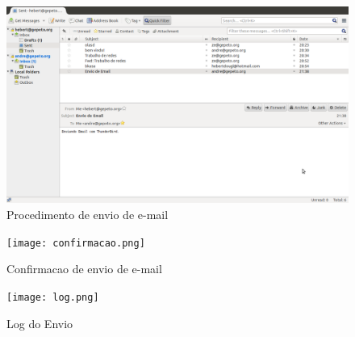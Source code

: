 \documentclass[12pt,answers]{exam}
\begin{document}
\begin{questions}
\begin{figure}[h]
     \centering
       \includegraphics[keepaspectratio=true,scale=0.3]{send.png}
     \caption{Procedimento de envio de e-mail}
\end{figure}

\begin{figure}[h]
     \centering
       \texttt{[image: confirmacao.png]}
     \caption{Confirmacao de envio de e-mail}
\end{figure}

\begin{figure}[h]
     \centering
       \texttt{[image: log.png]}
     \caption{Log do Envio}
\end{figure}

\end{questions}
	
\end{document}
